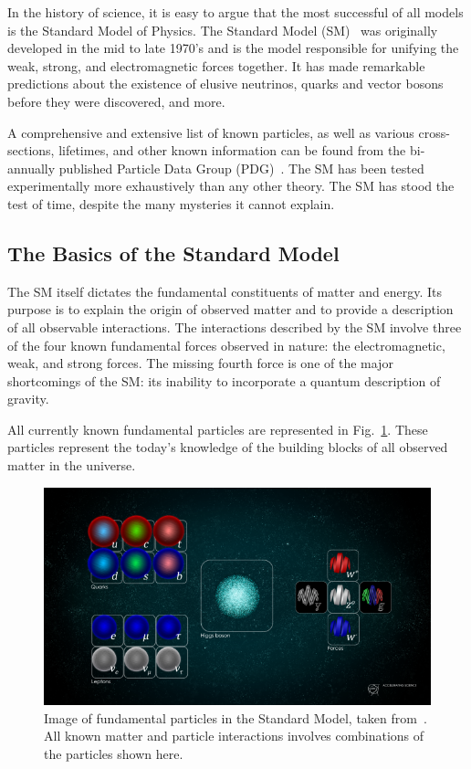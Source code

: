 In the history of science, it is easy to argue that the most successful of all models is the Standard Model of Physics.
The Standard Model (SM)~\citep{GLASHOW1961579, salam1964electromagnetic, weinberg1967model} was originally developed in the mid to late 1970's and is the model responsible for unifying the weak, strong, and electromagnetic forces together.
It has made remarkable predictions about the existence of elusive neutrinos, quarks and vector bosons before they were discovered, and more.

A comprehensive and extensive list of known particles, as well as various cross-sections, lifetimes, and other known information can be found from the bi-annually published Particle Data Group (PDG)~\citep{Workman:2022ynf}.
The SM has been tested experimentally more exhaustively than any other theory.
The SM has stood the test of time, despite the many mysteries it cannot explain.

\subsection{The Basics of the Standard Model}

The SM itself dictates the fundamental constituents of matter and energy.
Its purpose is to explain the origin of observed matter and to provide a description of all observable interactions.
The interactions described by the SM involve three of the four known fundamental forces observed in nature: the electromagnetic, weak, and strong forces.
The missing fourth force is one of the major shortcomings of the SM: its inability to incorporate a quantum description of gravity.

All currently known fundamental particles are represented in Fig.~\ref{fig:cern_sm}.
These particles represent the today's knowledge of the building blocks of all observed matter in the universe.

\begin{figure}[]
\centering
\includegraphics[width=\textwidth]{images/STDM_higgs_and_field_D.png}
\caption{Image of fundamental particles in the Standard Model, taken from~\citep{dominguez_2015}.
  All known matter and particle interactions involves combinations of the particles shown here.}
\label{fig:cern_sm}
\end{figure}

